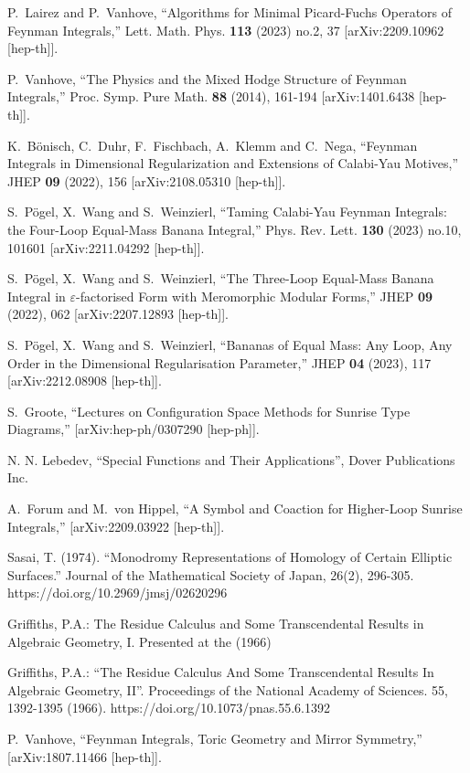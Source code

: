 \documentclass[a4paper,12pt]{article}
\numberwithin{equation}{section}
\numberwithin{figure}{section}
\begin{document}
\begin{thebibliography}{99}
P.~Lairez and P.~Vanhove,
``Algorithms for Minimal Picard-Fuchs Operators of Feynman Integrals,''
Lett. Math. Phys. \textbf{113} (2023) no.2, 37
[arXiv:2209.10962 [hep-th]].

  
P.~Vanhove,
``The Physics and the Mixed Hodge Structure of Feynman Integrals,''
Proc. Symp. Pure Math. \textbf{88} (2014), 161-194
[arXiv:1401.6438 [hep-th]].


K.~B\"onisch, C.~Duhr, F.~Fischbach, A.~Klemm and C.~Nega,
``Feynman Integrals in Dimensional Regularization and Extensions of Calabi-Yau Motives,''
JHEP \textbf{09} (2022), 156
[arXiv:2108.05310 [hep-th]].


S.~P\"ogel, X.~Wang and S.~Weinzierl,
``Taming Calabi-Yau Feynman Integrals: the Four-Loop Equal-Mass Banana Integral,''
Phys. Rev. Lett. \textbf{130} (2023) no.10, 101601
[arXiv:2211.04292 [hep-th]].

S.~P\"ogel, X.~Wang and S.~Weinzierl,
``The Three-Loop Equal-Mass Banana Integral in \ensuremath{\varepsilon}-factorised Form with Meromorphic Modular Forms,''
JHEP \textbf{09} (2022), 062
[arXiv:2207.12893 [hep-th]].

S.~P\"ogel, X.~Wang and S.~Weinzierl,
``Bananas of Equal Mass: Any Loop, Any Order in the Dimensional Regularisation Parameter,''
JHEP \textbf{04} (2023), 117
[arXiv:2212.08908 [hep-th]].

S.~Groote,
``Lectures on Configuration Space Methods for Sunrise Type Diagrams,''
[arXiv:hep-ph/0307290 [hep-ph]].
  
 N. N. Lebedev, ``Special Functions and Their
  Applications'', Dover Publications Inc. 

A.~Forum and M.~von Hippel,
``A Symbol and Coaction for Higher-Loop Sunrise Integrals,''
[arXiv:2209.03922 [hep-th]].

 Sasai, T. (1974). ``Monodromy Representations of
  Homology of Certain Elliptic Surfaces.'' Journal of the Mathematical
  Society of Japan, 26(2),
  296-305. https://doi.org/10.2969/jmsj/02620296

   Griffiths, P.A.: The Residue Calculus and Some
    Transcendental Results in Algebraic Geometry, I. Presented at the
    (1966)

    Griffiths, P.A.: ``The Residue Calculus And Some Transcendental
    Results In Algebraic Geometry, II''. Proceedings of the National
    Academy of Sciences. 55, 1392-1395
    (1966). https://doi.org/10.1073/pnas.55.6.1392 
  
P.~Vanhove,
``Feynman Integrals, Toric Geometry and Mirror Symmetry,''
[arXiv:1807.11466 [hep-th]].

\end{thebibliography}
\end{document}
